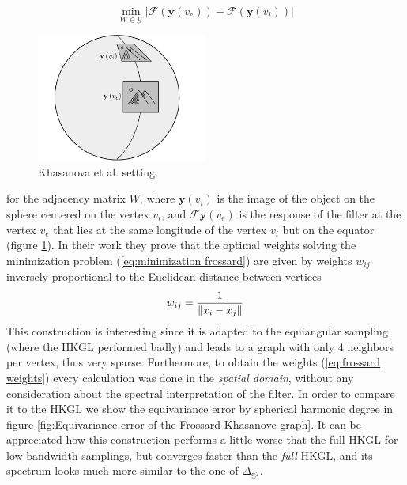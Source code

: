 \begin{equation}\label{eq:minimization frossard}
	\min_{W\in\mathcal G} \left|\mathcal{F}\left(\mathbf{y}\left(v_{ e}\right)\right)-\mathcal{F}\left(\mathbf{y}\left(v_{ i}\right)\right)\right|
\end{equation}
\begin{figure}
	\begin{center}
		\includegraphics[width=0.5\textwidth]{figs/Chapter3/frossard2.png}
	\end{center}
	\caption{\label{fig:frossard2}Khasanova et al. setting.}
\end{figure}
for the adjacency matrix $W$, where $\mathbf y(v_i)$ is the image of the object on the sphere centered on the vertex $v_i$, and $\mathcal F \mathbf y(v_e)$ is the response of the filter at the vertex $v_e$ that lies at the same longitude of the vertex $v_i$ but on the equator (figure \ref{fig:frossard2}). In their work they prove that the optimal weights solving the minimization problem (\ref{eq:minimization frossard}) are given by weights $w_{ij}$ inversely proportional to the Euclidean distance between vertices
\begin{equation}\label{eq:frossard weights}
	w_{ij} = \frac{1}{\left\lVert x_i-x_j\right\rVert}
\end{equation}
This construction is interesting since it is adapted to the equiangular sampling (where the HKGL performed badly) and leads to a graph with only 4 neighbors per vertex, thus very sparse. Furthermore, to obtain the weights (\ref{eq:frossard weights}) every calculation was done in the \textit{spatial domain}, without any consideration about the spectral interpretation of the filter. In order to compare it to the HKGL we show the equivariance error by spherical harmonic degree in figure \ref{fig:Equivariance error of the Frossard-Khasanove graph}. It can be appreciated how this construction performs a little worse that the full HKGL for low bandwidth samplings, but converges faster than the \textit{full} HKGL, and its spectrum looks much more similar to the one of $\Delta_{\mathbb S^2}$.

